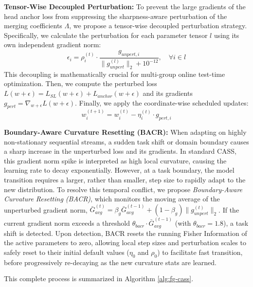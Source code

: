 \documentclass{article}
\theoremstyle{plain}
\theoremstyle{definition}
\theoremstyle{remark}
\begin{document}
\textbf{Tensor-Wise Decoupled Perturbation:}
To prevent the large gradients of the head anchor loss from suppressing the sharpness-aware perturbation of the merging coefficients $\Lambda$, we propose a tensor-wise decoupled perturbation strategy. Specifically, we calculate the perturbation for each parameter tensor $l$ using its own independent gradient norm:
\begin{equation}
\epsilon_i = \rho_i^{(t)} \cdot \frac{g_{unpert, i}}{\|g_{unpert}^{(l)}\|_2 + 10^{-12}}, \quad \forall i \in l
\end{equation}
This decoupling is mathematically crucial for multi-group online test-time optimization. Then, we compute the perturbed loss $L(w + \epsilon) = L_{SL}(w + \epsilon) + L_{anchor}(w + \epsilon)$ and its gradients $g_{pert} = \nabla_{w + \epsilon} L(w + \epsilon)$. Finally, we apply the coordinate-wise scheduled updates:
\begin{equation}
w_i^{(t+1)} = w_i^{(t)} - \eta_i^{(t)} \cdot g_{pert, i}
\end{equation}

\textbf{Boundary-Aware Curvature Resetting (BACR):}
When adapting on highly non-stationary sequential streams, a sudden task shift or domain boundary causes a sharp increase in the unperturbed loss and its gradients. In standard CASS, this gradient norm spike is interpreted as high local curvature, causing the learning rate to decay exponentially. However, at a task boundary, the model transition requires a larger, rather than smaller, step size to rapidly adapt to the new distribution. To resolve this temporal conflict, we propose \textit{Boundary-Aware Curvature Resetting (BACR)}, which monitors the moving average of the unperturbed gradient norm, $\bar{G}_{avg}^{(t)} = \beta_g \bar{G}_{avg}^{(t-1)} + (1 - \beta_g) \|g_{unpert}^{(t)}\|_2$. If the current gradient norm exceeds a threshold $\theta_{bacr} \cdot \bar{G}_{avg}^{(t-1)}$ (with $\theta_{bacr} = 1.8$), a task shift is detected. Upon detection, BACR resets the running Fisher Information of the active parameters to zero, allowing local step sizes and perturbation scales to safely reset to their initial default values ($\eta_0$ and $\rho_0$) to facilitate fast transition, before progressively re-decaying as the new curvature stats are learned.

This complete process is summarized in Algorithm \ref{alg:fg-cass}.
\end{document}

